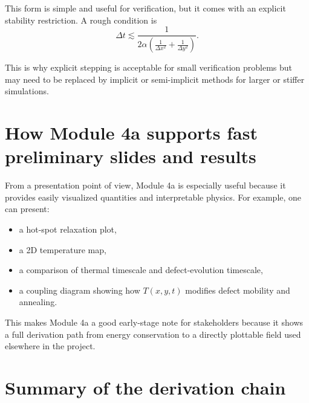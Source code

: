 \documentclass[11pt]{article}
\begin{document}
This form is simple and useful for verification, but it comes with an explicit stability restriction. A rough condition is
\begin{equation}
\Delta t \lesssim \frac{1}{2\alpha\left(\frac{1}{\Delta x^2}+\frac{1}{\Delta y^2}\right)}.
\end{equation}

This is why explicit stepping is acceptable for small verification problems but may need to be replaced by implicit or semi-implicit methods for larger or stiffer simulations.

\section{How Module 4a supports fast preliminary slides and results}

From a presentation point of view, Module 4a is especially useful because it provides easily visualized quantities and interpretable physics. For example, one can present:
\begin{itemize}
    \item a hot-spot relaxation plot,
    \item a 2D temperature map,
    \item a comparison of thermal timescale and defect-evolution timescale,
    \item a coupling diagram showing how $T(x,y,t)$ modifies defect mobility and annealing.
\end{itemize}

This makes Module 4a a good early-stage note for stakeholders because it shows a full derivation path from energy conservation to a directly plottable field used elsewhere in the project.

\section{Summary of the derivation chain}
\end{document}
